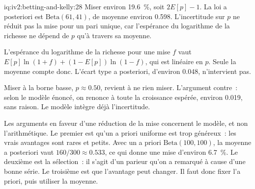\begin{solution}{iq:iv2:betting-and-kelly:28}
Miser environ 19.6~\%, soit $2E[p] - 1$. La loi a posteriori est $\mathrm{Beta}(61, 41)$, de moyenne environ 0.598. L'incertitude sur $p$ ne réduit pas la mise pour un pari unique, car l'espérance du logarithme de la richesse ne dépend de $p$ qu'à travers sa moyenne.

L'espérance du logarithme de la richesse pour une mise $f$ vaut $E[p]\ln(1 + f) + (1 - E[p])\ln(1 - f)$, qui est linéaire en $p$. Seule la moyenne compte donc. L'écart type a posteriori, d'environ 0.048, n'intervient pas.

Miser à la borne basse, $p \approx 0.50$, revient à ne rien miser. L'argument contre~: selon le modèle énoncé, on renonce à toute la croissance espérée, environ 0.019, sans raison. Le modèle intègre déjà l'incertitude.

Les arguments en faveur d'une réduction de la mise concernent le modèle, et non l'arithmétique. Le premier est qu'un a priori uniforme est trop généreux~: les vrais avantages sont rares et petits. Avec un a priori $\mathrm{Beta}(100, 100)$, la moyenne a posteriori vaut $160/300 \approx 0.533$, ce qui donne une mise d'environ 6.7~\%. Le deuxième est la sélection~: il s'agit d'un parieur qu'on a remarqué à cause d'une bonne série. Le troisième est que l'avantage peut changer. Il faut donc fixer l'a priori, puis utiliser la moyenne.

\end{solution}

